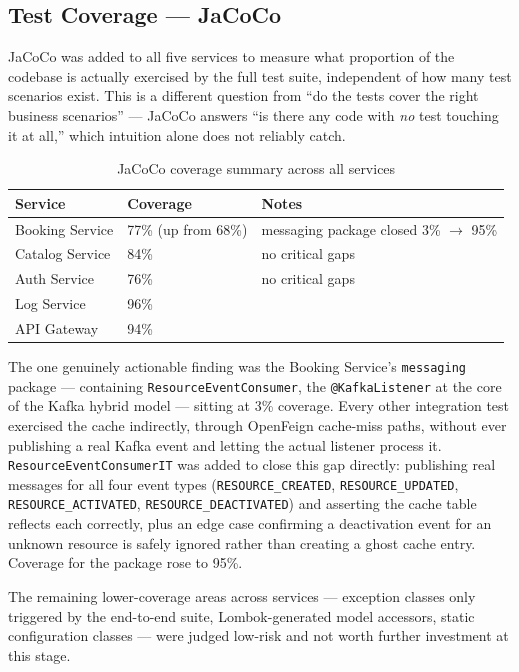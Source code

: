 \subsection{Test Coverage --- JaCoCo}

JaCoCo was added to all five services to measure what proportion of the codebase is actually exercised by the full test suite, independent of how many test scenarios exist. This is a different question from ``do the tests cover the right business scenarios'' --- JaCoCo answers ``is there any code with \emph{no} test touching it at all,'' which intuition alone does not reliably catch.

\begin{table}[H]
\centering
\begin{tabular}{lll}
\toprule
\textbf{Service} & \textbf{Coverage} & \textbf{Notes} \\
\midrule
Booking Service & 77\% (up from 68\%) & messaging package closed 3\% $\rightarrow$ 95\% \\
Catalog Service & 84\% & no critical gaps \\
Auth Service & 76\% & no critical gaps \\
Log Service & 96\% & \\
API Gateway & 94\% & \\
\bottomrule
\end{tabular}
\caption{JaCoCo coverage summary across all services}
\end{table}

The one genuinely actionable finding was the Booking Service's \texttt{messaging} package --- containing \texttt{ResourceEventConsumer}, the \texttt{@KafkaListener} at the core of the Kafka hybrid model --- sitting at 3\% coverage. Every other integration test exercised the cache indirectly, through OpenFeign cache-miss paths, without ever publishing a real Kafka event and letting the actual listener process it. \texttt{ResourceEventConsumerIT} was added to close this gap directly: publishing real messages for all four event types (\texttt{RESOURCE\_CREATED}, \texttt{RESOURCE\_UPDATED}, \texttt{RESOURCE\_ACTIVATED}, \texttt{RESOURCE\_DEACTIVATED}) and asserting the cache table reflects each correctly, plus an edge case confirming a deactivation event for an unknown resource is safely ignored rather than creating a ghost cache entry. Coverage for the package rose to 95\%.

The remaining lower-coverage areas across services --- exception classes only triggered by the end-to-end suite, Lombok-generated model accessors, static configuration classes --- were judged low-risk and not worth further investment at this stage.

